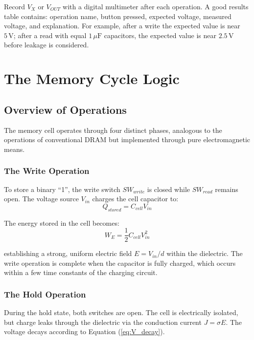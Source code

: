 \documentclass[12pt,a4paper]{report}
\begin{document}
Record $V_X$ or $V_{OUT}$ with a digital multimeter after each operation. A good results table contains: operation name, button pressed, expected voltage, measured voltage, and explanation. For example, after a write the expected value is near $5\,\mathrm{V}$; after a read with equal $1\,\mu\mathrm{F}$ capacitors, the expected value is near $2.5\,\mathrm{V}$ before leakage is considered.

\chapter{The Memory Cycle Logic}
\label{ch:cycle}

\section{Overview of Operations}

The memory cell operates through four distinct phases, analogous to the operations of conventional DRAM but implemented through pure electromagnetic means.

\subsection{The Write Operation}

To store a binary ``1'', the write switch $SW_{write}$ is closed while $SW_{read}$ remains open. The voltage source $V_{in}$ charges the cell capacitor to:
\begin{equation}
    Q_{stored} = C_{cell} V_{in}
    \label{eq:write_Q}
\end{equation}

The energy stored in the cell becomes:
\begin{equation}
    W_E = \frac{1}{2} C_{cell} V_{in}^2
    \label{eq:write_energy}
\end{equation}

establishing a strong, uniform electric field $E = V_{in}/d$ within the dielectric. The write operation is complete when the capacitor is fully charged, which occurs within a few time constants of the charging circuit.

\subsection{The Hold Operation}

During the hold state, both switches are open. The cell is electrically isolated, but charge leaks through the dielectric via the conduction current $J = \sigma E$. The voltage decays according to Equation (\ref{eq:V_decay}).
\end{document}
